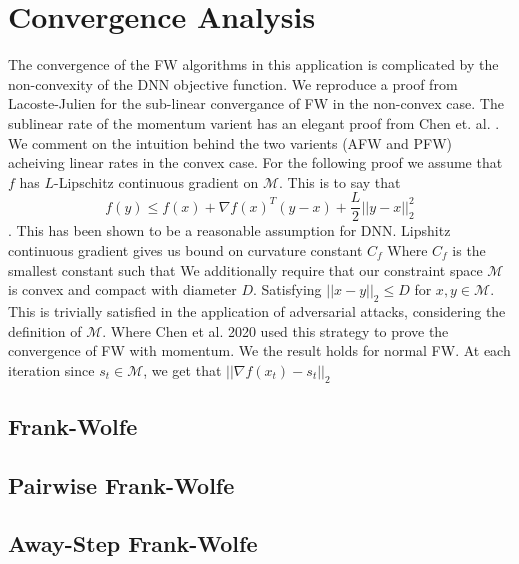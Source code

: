 \documentclass{article}
\begin{document}
\section{Convergence Analysis}
The convergence of the FW algorithms in this application is complicated by the non-convexity of the DNN objective function.
We reproduce a proof from Lacoste-Julien \cite{fw-noncovex} for the sub-linear convergance of FW in the non-convex case. The sublinear rate of the momentum varient has an elegant proof from Chen et. al. \cite{attacks}. We comment on the intuition behind the two varients (AFW and PFW) acheiving linear rates in the convex case.
For the following proof we assume that $f$ has $L$-Lipschitz continuous gradient on $\mathcal{M}$. This is to say that 
$$ f(y) \leq f(x) + \nabla f(x)^T (y-x) + \frac{L}{2}||y-x||_2^2$$.
This has been shown to be a reasonable assumption for DNN. %
Lipshitz continuous gradient gives us bound on curvature constant $C_f$ %
Where $C_f$ is the smallest constant such that 
We additionally require that our constraint space $\mathcal{M}$ is convex and compact with diameter $D$. Satisfying $||x-y||_2 \leq D$ for $x,y \in \mathcal{M}$. This is trivially satisfied in the application of adversarial attacks, considering the definition of $\mathcal{M}$. 
Where Chen et al. 2020 used this strategy to prove the convergence of FW with momentum. We the result holds for normal FW. 
At each iteration since $s_t \in \mathcal{M}$, we get that $||\nabla f(x_t) - s_t||_2$

\subsection{Frank-Wolfe}
\subsection{Pairwise Frank-Wolfe}
\subsection{Away-Step Frank-Wolfe}


\end{document}
